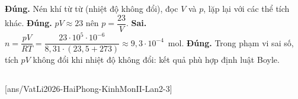 \begin{ex}
{			\begin{itemchoice}
				\itemch \textbf{Đúng.} Nén khí từ từ (nhiệt độ không đổi), đọc $V$ và $p$, lặp lại với các thể tích khác.
				\itemch \textbf{Đúng.} $pV\approx 23$ nên $p=\dfrac{23}{V}$.
				\itemch \textbf{Sai.} $n=\dfrac{pV}{RT}=\dfrac{23\cdot 10^5\cdot 10^{-6}}{8{,}31\cdot(23{,}5+273)}\approx 9{,}3\cdot 10^{-4}$~mol.
				\itemch \textbf{Đúng.} Trong phạm vi sai số, tích $pV$ không đổi khi nhiệt độ không đổi: kết quả phù hợp định luật Boyle.
			\end{itemchoice}
		}
	\end{ex}

	\subsection*{}
	\setcounter{ex}{0}
	[ans/VatLi2026-HaiPhong-KinhMonII-Lan2-3]

